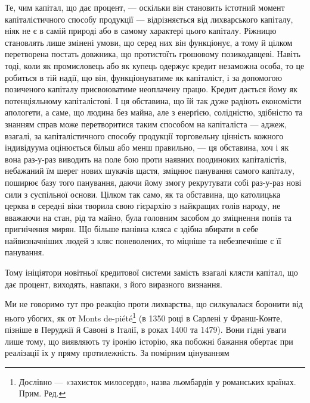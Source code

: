 Те, чим капітал, що дає процент, — оскільки він становить істотний момент
капіталістичного способу продукції — відрізняється від лихварського капіталу,
ніяк не є в самій природі або в самому характері цього капіталу. Ріжницю становлять
лише змінені умови, що серед них він функціонує, а тому й цілком
перетворена постать довжника, що протистоїть грошовому позикодавцеві. Навіть
тоді, коли як промисловець або як купець одержує кредит незаможна особа, то
це робиться в тій надії, що він, функціонуватиме як капіталіст, і за допомогою
позиченого капіталу присвоюватиме неоплачену працю. Кредит дається йому як
потенціяльному капіталістові. І ця обставина, що їй так дуже радіють економісти
апологети, а саме, що людина без майна, але з енерґією, солідністю, здібністю
та знанням справ може перетворитися таким способом на капіталіста — аджеж,
взагалі, за капіталістичного способу продукції торговельну цінність кожного
індивідуума оцінюється більш або менш правильно, — ця обставина, хоч і як
вона раз-у-раз виводить на поле бою проти наявних поодиноких капіталістів,
небажаний їм шерег нових шукачів щастя, зміцнює панування самого капіталу,
поширює базу того панування, даючи йому змогу рекрутувати собі раз-у-раз
нові сили з суспільної основи. Цілком так само, як та обставина, що католицька
церква в середні віки творила свою гієрархію з найкращих голів народу, не
вважаючи на стан, рід та майно, була головним засобом до зміцнення попів та
пригнічення мирян. Що більше панівна кляса є здібна вбирати в себе найвизначніших
людей з кляс поневолених, то міцніше та небезпечніше є її панування.

Тому ініціятори новітньої кредитової системи замість взагалі клясти капітал,
що дає процент, виходять, навпаки, з його виразного визнання.

Ми не говоримо тут про реакцію проти лихварства, що силкувалася боронити
від нього убогих, як от Monts de-piété\footnote*{
Дослівно — «захисток милосердя», назва льомбардів у романських країнах. Прим. Ред.
} (в 1350 році в Сарлені у Франш-Конте,
пізніше в Перуджії й Савоні в Італії, в роках 1400 та 1479). Вони
гідні уваги лише тому, що виявляють ту іронію історію, яка побожні бажання
обертає при реалізації їх у пряму протилежність. За помірним цінуванням